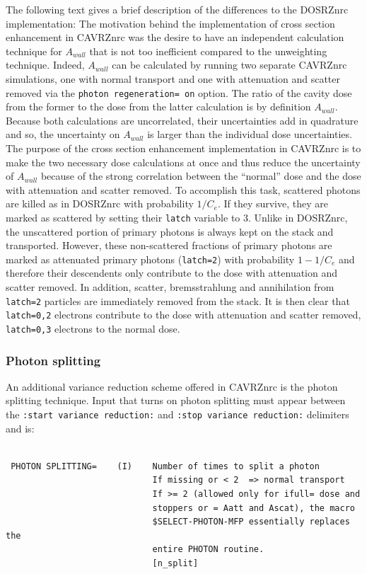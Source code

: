 \documentclass[12pt,twoside]{article}  %
\begin{document}
The following text gives a brief description of the differences
to the DOSRZnrc implementation: The motivation behind the
implementation of cross section enhancement in CAVRZnrc was the desire to
have an independent calculation technique for $A_{wall}$ that is
not too inefficient compared to the unweighting technique. Indeed,
$A_{wall}$ can be calculated by running two separate CAVRZnrc
simulations, one with normal transport  and one with attenuation
and scatter removed via the {\tt photon regeneration= on} option. The ratio of the
cavity dose from the former to the dose from the latter calculation is by
definition $A_{wall}$. Because both calculations
are uncorrelated, their uncertainties add in quadrature and so, the uncertainty
on $A_{wall}$ is larger than the individual dose uncertainties.
The purpose of the cross section enhancement implementation in
CAVRZnrc is to make the two necessary dose calculations at once
and thus reduce the uncertainty of $A_{wall}$ because of the strong
correlation between the ``normal'' dose and the dose with
attenuation and scatter removed. To accomplish this task,
scattered photons are killed as in DOSRZnrc with probability
$1/C_e$. If they survive, they are marked as scattered by setting
their {\tt latch} variable to 3. Unlike in DOSRZnrc, the unscattered
portion of primary photons is always kept on the stack and transported.
However, these non-scattered fractions of primary photons are marked
as attenuated primary photons ({\tt latch=2}) with probability
$1-1/C_e$ and therefore their descendents only contribute to the
dose with attenuation and scatter removed. In addition, scatter,
bremsstrahlung and annihilation from {\tt latch=2} particles are
immediately removed from the stack. It is then clear that
{\tt latch=0,2} electrons contribute to the dose with
attenuation and scatter removed, {\tt latch=0,3} electrons to
the normal dose.

\subsubsection{Photon splitting}
\label{cavrzsplitsect}

An additional variance reduction scheme offered in CAVRZnrc
is the photon splitting technique.
Input that turns on photon splitting must appear
between the {\tt :start variance reduction:}
and {\tt :stop variance reduction:} delimiters and is:

\begin{verbatim}

 PHOTON SPLITTING=    (I)    Number of times to split a photon
                             If missing or < 2  => normal transport
                             If >= 2 (allowed only for ifull= dose and
                             stoppers or = Aatt and Ascat), the macro
                             $SELECT-PHOTON-MFP essentially replaces the
                             entire PHOTON routine.
                             [n_split]

\end{verbatim}
\end{document}

